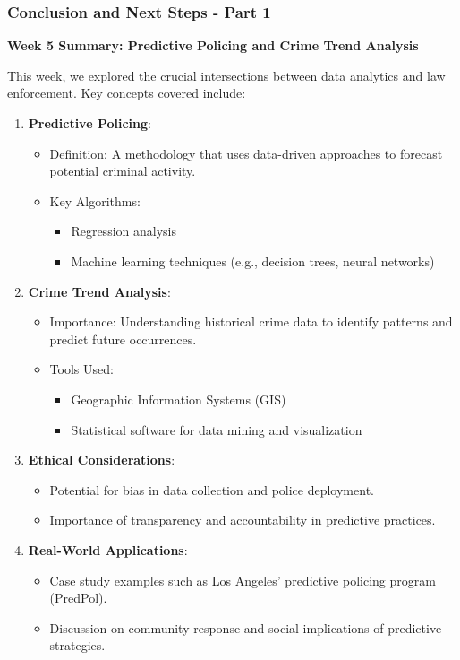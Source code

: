 \documentclass[aspectratio=169]{beamer}
\begin{document}
\begin{frame}[fragile]
    \frametitle{Conclusion and Next Steps - Part 1}
    \textbf{Week 5 Summary: Predictive Policing and Crime Trend Analysis}
    
    This week, we explored the crucial intersections between data analytics and law enforcement. Key concepts covered include:
    
    \begin{enumerate}
        \item \textbf{Predictive Policing}:
        \begin{itemize}
            \item Definition: A methodology that uses data-driven approaches to forecast potential criminal activity.
            \item Key Algorithms: 
            \begin{itemize}
                \item Regression analysis
                \item Machine learning techniques (e.g., decision trees, neural networks)
            \end{itemize}
        \end{itemize}
        
        \item \textbf{Crime Trend Analysis}:
        \begin{itemize}
            \item Importance: Understanding historical crime data to identify patterns and predict future occurrences.
            \item Tools Used: 
            \begin{itemize}
                \item Geographic Information Systems (GIS)
                \item Statistical software for data mining and visualization
            \end{itemize}
        \end{itemize}
        
        \item \textbf{Ethical Considerations}:
        \begin{itemize}
            \item Potential for bias in data collection and police deployment.
            \item Importance of transparency and accountability in predictive practices.
        \end{itemize}
        
        \item \textbf{Real-World Applications}:
        \begin{itemize}
            \item Case study examples such as Los Angeles’ predictive policing program (PredPol).
            \item Discussion on community response and social implications of predictive strategies.
        \end{itemize}
    \end{enumerate}
\end{frame}
\end{document}
